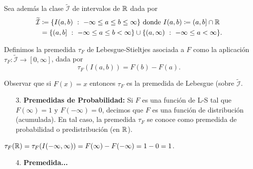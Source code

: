 \noindent Sea además la clase $\widetilde{\mathcal{I}}$ de intervalos de $\mathbb{R}$ dada por
\begin{align*}
	\widetilde{\mathcal{I}} & \coloneq \{ I(a,b) \ : \ -\infty \leq a \leq b \leq \infty \} \text{ donde } I(a,b) \coloneq (a,b] \cap \mathbb{R} \\
	& = \{ (a,b] \ : \ -\infty \leq a \leq b < \infty\} \cup \{ (a,\infty) \ : \ -\infty \leq a < \infty \} 
.\end{align*}

\noindent Definimos la premedida $\tau_F$ de Lebesgue-Stieltjes asociada a $F$ como la aplicación $\tau_F: \widetilde{\mathcal{I}} \to [0, \infty]$, dada por
\[ \tau_F (I(a,b)) = F(b) - F(a) .\]

\begin{note}
	Observar que si $F(x)=x$ entonces $\tau_F$ es la premedida de Lebesgue (sobre $\widetilde{\mathcal{I}}$.
\end{note}

\begin{enumerate}
	\item[3.] \textbf{Premedidas de Probabilidad:} Si $F$ es una función de L-S tal que $F(\infty) = 1$ y $F(-\infty) = 0$, decimos que $F$ es una función de distribución (acumulada). En tal caso, la premedida $\tau_F$ se conoce como premedida de probabilidad o predistribución (en $\mathbb{R}$).
\end{enumerate}

\begin{remark}
	$\tau_F (\mathbb{R}) = \tau_F (I(-\infty,\infty)) = F(\infty) - F(-\infty) = 1 - 0 = 1$.
\end{remark}

\begin{enumerate}
	\item[4.] \textbf{Premedida...}
\end{enumerate}

